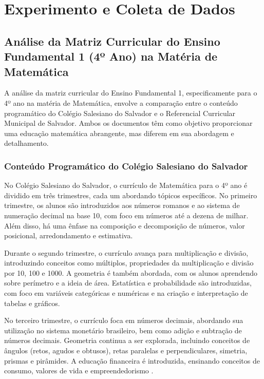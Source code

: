 \chapter{Experimento e Coleta de Dados} \label{chp:exp}

\section{Análise da Matriz Curricular do Ensino Fundamental 1 (4º Ano) na Matéria de Matemática}

A análise da matriz curricular do Ensino Fundamental 1, especificamente para o 4º ano na matéria de Matemática, envolve a comparação entre o conteúdo programático do Colégio Salesiano do Salvador e o Referencial Curricular Municipal de Salvador. Ambos os documentos têm como objetivo proporcionar uma educação matemática abrangente, mas diferem em sua abordagem e detalhamento.

\subsection{Conteúdo Programático do Colégio Salesiano do Salvador}

No Colégio Salesiano do Salvador, o currículo de Matemática para o 4º ano é dividido em três trimestres, cada um abordando tópicos específicos. No primeiro trimestre, os alunos são introduzidos aos números romanos e ao sistema de numeração decimal na base 10, com foco em números até a dezena de milhar. Além disso, há uma ênfase na composição e decomposição de números, valor posicional, arredondamento e estimativa.

Durante o segundo trimestre, o currículo avança para multiplicação e divisão, introduzindo conceitos como múltiplos, propriedades da multiplicação e divisão por 10, 100 e 1000. A geometria é também abordada, com os alunos aprendendo sobre perímetro e a ideia de área. Estatística e probabilidade são introduzidas, com foco em variáveis categóricas e numéricas e na criação e interpretação de tabelas e gráficos.

No terceiro trimestre, o currículo foca em números decimais, abordando sua utilização no sistema monetário brasileiro, bem como adição e subtração de números decimais. Geometria continua a ser explorada, incluindo conceitos de ângulos (retos, agudos e obtusos), retas paralelas e perpendiculares, simetria, prismas e pirâmides. A educação financeira é introduzida, ensinando conceitos de consumo, valores de vida e empreendedorismo \cite{conteudo_programatico_salesiano}.

